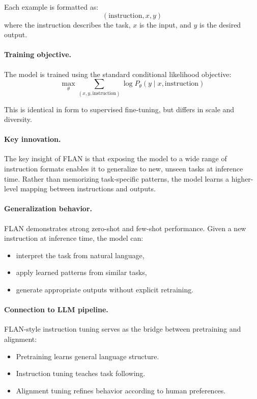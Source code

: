 \documentclass{article}
\begin{document}
Each example is formatted as:
\[
(\text{instruction}, x, y)
\]
where the instruction describes the task, $x$ is the input, and $y$ is the desired output.

\paragraph{Training objective.}
The model is trained using the standard conditional likelihood objective:
\[
\max_\theta \sum_{(x,y,\text{instruction})} \log P_\theta(y \mid x, \text{instruction})
\]

This is identical in form to supervised fine-tuning, but differs in scale and diversity.

\paragraph{Key innovation.}
The key insight of FLAN is that exposing the model to a wide range of instruction formats enables it to generalize to new, unseen tasks at inference time. Rather than memorizing task-specific patterns, the model learns a higher-level mapping between instructions and outputs.

\paragraph{Generalization behavior.}
FLAN demonstrates strong zero-shot and few-shot performance. Given a new instruction at inference time, the model can:
\begin{itemize}
    \item interpret the task from natural language,
    \item apply learned patterns from similar tasks,
    \item generate appropriate outputs without explicit retraining.
\end{itemize}

\paragraph{Connection to LLM pipeline.}
FLAN-style instruction tuning serves as the bridge between pretraining and alignment:
\begin{itemize}
    \item Pretraining learns general language structure.
    \item Instruction tuning teaches task following.
    \item Alignment tuning refines behavior according to human preferences.
\end{itemize}
\end{document}

